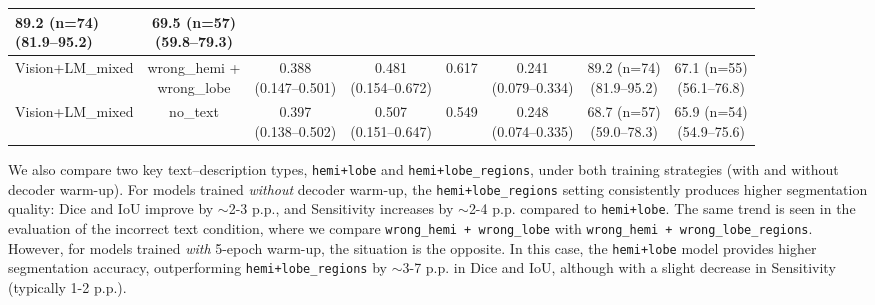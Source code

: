 \documentclass[FCD_GNN.tex]{subfiles}
\begin{document}
\begin{table}[H]
\begin{tabular}{lccccccc}
    \makecell{89.2 (n=74) \\ (81.9--95.2)} &
    \makecell{\colorbox{cyan!15}{69.5 (n=57)} \\ (59.8--79.3)} \\
    \hline
    Vision+LM\_mixed &
    \makecell{wrong\_hemi + \\ wrong\_lobe} &
    \makecell{0.388 \\ (0.147--0.501)} &
    \makecell{0.481 \\ (0.154--0.672)} &
    \colorbox{orange!15}{0.617} &
    \makecell{0.241 \\ (0.079--0.334)} &
    \makecell{89.2 (n=74) \\ (81.9--95.2)} &
    \makecell{67.1 (n=55) \\ (56.1--76.8)} \\
    \hline
    Vision+LM\_mixed &
    no\_text &
    \makecell{\colorbox{orange!15}{0.397} \\ (0.138--0.502)} &
    \makecell{\colorbox{orange!15}{0.507} \\ (0.151--0.647)} &
    0.549 &
    \makecell{\colorbox{orange!15}{0.248} \\ (0.074--0.335)} &
    \makecell{68.7 (n=57) \\ (59.0--78.3)} & 
    \makecell{65.9 (n=54) \\ (54.9--75.6)} \\
    \hline
    \end{tabular}
\end{table}
    
We also compare two key text--description types, \texttt{hemi+lobe} and \texttt{hemi+lobe\_regions},
under both training strategies (with and without decoder warm-up). For models trained \emph{without} decoder warm-up, the \texttt{hemi+lobe\_regions} setting consistently produces higher segmentation quality:
Dice and IoU improve by $\sim$2-3 \ac{p.p.}, and Sensitivity increases by $\sim$2-4 \ac{p.p.} compared to
\texttt{hemi+lobe}. The same trend is seen in the evaluation of the incorrect text condition, where we compare
\texttt{wrong\_hemi + wrong\_lobe} with \texttt{wrong\_hemi + wrong\_lobe\_regions}. However, for models trained \emph{with} 5-epoch warm-up, the situation is the opposite. 
In this case, the \texttt{hemi+lobe} model provides higher segmentation accuracy, outperforming \texttt{hemi+lobe\_regions} 
by $\sim$3-7 \ac{p.p.} in Dice and IoU, although with a slight decrease in Sensitivity (typically 1-2 \ac{p.p.}).
\end{document}
